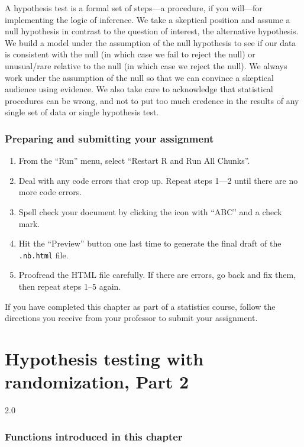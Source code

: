 \documentclass[
]{book}
\providecommand{\tightlist}{%
  \setlength{\itemsep}{0pt}\setlength{\parskip}{0pt}}
\begin{document}
A hypothesis test is a formal set of steps---a procedure, if you will---for implementing the logic of inference. We take a skeptical position and assume a null hypothesis in contrast to the question of interest, the alternative hypothesis. We build a model under the assumption of the null hypothesis to see if our data is consistent with the null (in which case we fail to reject the null) or unusual/rare relative to the null (in which case we reject the null). We always work under the assumption of the null so that we can convince a skeptical audience using evidence. We also take care to acknowledge that statistical procedures can be wrong, and not to put too much credence in the results of any single set of data or single hypothesis test.

\hypertarget{hypothesis1-prep}{%
\subsection{Preparing and submitting your assignment}\label{hypothesis1-prep}}

\begin{enumerate}
\def\labelenumi{\arabic{enumi}.}
\tightlist
\item
  From the ``Run'' menu, select ``Restart R and Run All Chunks''.
\item
  Deal with any code errors that crop up. Repeat steps 1---2 until there are no more code errors.
\item
  Spell check your document by clicking the icon with ``ABC'' and a check mark.
\item
  Hit the ``Preview'' button one last time to generate the final draft of the \texttt{.nb.html} file.
\item
  Proofread the HTML file carefully. If there are errors, go back and fix them, then repeat steps 1--5 again.
\end{enumerate}

If you have completed this chapter as part of a statistics course, follow the directions you receive from your professor to submit your assignment.

\hypertarget{hypothesis2}{%
\chapter{Hypothesis testing with randomization, Part 2}\label{hypothesis2}}

2.0

\hypertarget{functions-introduced-in-this-chapter-10}{%
\subsection*{Functions introduced in this chapter}\label{functions-introduced-in-this-chapter-10}}
\end{document}
